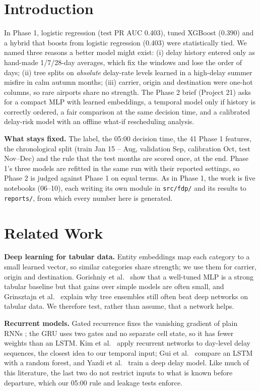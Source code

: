 \documentclass[conference]{IEEEtran}
\begin{document}
\section{Introduction}
In Phase 1, logistic regression (test PR AUC 0.403), tuned XGBoost (0.390) and a hybrid that boosts from logistic regression (0.403) were statistically tied. We named three reasons a better model might exist: (i) delay history entered only as hand-made 1/7/28-day averages, which fix the windows and lose the order of days; (ii) tree splits on \emph{absolute} delay-rate levels learned in a high-delay summer misfire in calm autumn months; (iii) carrier, origin and destination were one-hot columns, so rare airports share no strength. The Phase 2 brief (Project 21) asks for a compact MLP with learned embeddings, a temporal model only if history is correctly ordered, a fair comparison at the same decision time, and a calibrated delay-risk model with an offline what-if rescheduling analysis.

\textbf{What stays fixed.} The label, the 05:00 decision time, the 41 Phase 1 features, the chronological split (train Jan 15 -- Aug, validation Sep, calibration Oct, test Nov--Dec) and the rule that the test months are scored once, at the end. Phase 1's three models are refitted in the same run with their reported settings, so Phase 2 is judged against Phase 1 on equal terms. As in Phase 1, the work is five notebooks (06--10), each writing its own module in \texttt{src/fdp/} and its results to \texttt{reports/}, from which every number here is generated.

\section{Related Work}
\textbf{Deep learning for tabular data.} Entity embeddings \cite{guo2016} map each category to a small learned vector, so similar categories share strength; we use them for carrier, origin and destination. Gorishniy et al.\ \cite{gorishniy2021} show that a well-tuned MLP is a strong tabular baseline but that gains over simple models are often small, and Grinsztajn et al.\ \cite{grinsztajn2022} explain why tree ensembles still often beat deep networks on tabular data. We therefore test, rather than assume, that a network helps.

\textbf{Recurrent models.} Gated recurrence fixes the vanishing gradient of plain RNNs \cite{hochreiter1997}; the GRU \cite{cho2014} uses two gates and no separate cell state, so it has fewer weights than an LSTM. Kim et al.\ \cite{kim2016} apply recurrent networks to day-level delay sequences, the closest idea to our temporal input; Gui et al.\ \cite{gui2020} compare an LSTM with a random forest, and Yazdi et al.\ \cite{yazdi2020} train a deep delay model. Like much of this literature, the last two do not restrict inputs to what is known before departure, which our 05:00 rule and leakage tests enforce.
\end{document}
